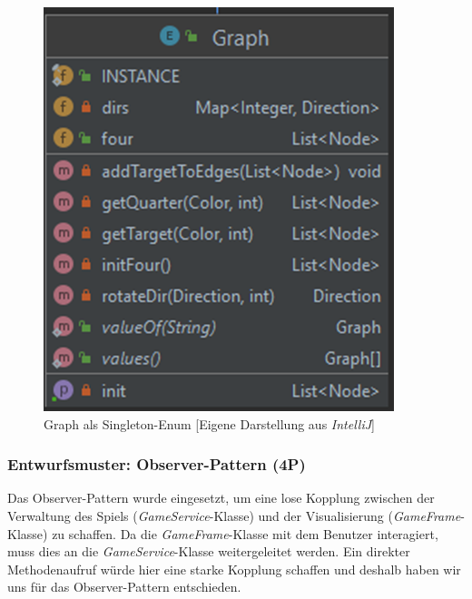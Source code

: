 \begin{figure}[htbp]
\centering
\centerline{\includegraphics[scale=.5]{singleton}}
\caption{Graph als Singleton-Enum [Eigene Darstellung aus \emph{IntelliJ}]}
\label{fig:singleton}
\end{figure}

\newpage
\subsubsection{Entwurfsmuster: Observer-Pattern (4P)}
\noindent Das Observer-Pattern wurde eingesetzt, um eine lose Kopplung zwischen der Verwaltung des Spiels (\emph{GameService}-Klasse) und der Visualisierung (\emph{GameFrame}-Klasse) zu schaffen. Da die \emph{GameFrame}-Klasse mit dem Benutzer interagiert, muss dies an die \emph{GameService}-Klasse weitergeleitet werden. Ein direkter Methodenaufruf würde hier eine starke Kopplung schaffen und deshalb haben wir uns für das Observer-Pattern entschieden.

